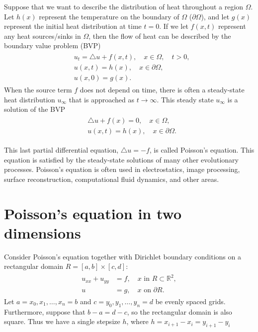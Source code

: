 \label{lab:poisson2d}

Suppose that we want to describe the distribution of heat throughout a region $\Omega$.
Let $h(x)$ represent the temperature on the boundary of $\Omega$ ($\partial \Omega$), and let $g(x)$ represent the initial heat distribution at time $t = 0$.
If we let $f(x,t)$ represent any heat sources/sinks in $\Omega$, then the flow of heat can be described by the boundary value problem (BVP)
\begin{align}
	\begin{split}
		& { } u_t = \triangle u + f(x,t), \quad x \in \Omega, \quad t >0,\\
		& { }u(x,t) = h(x), \quad x \in \partial \Omega, \\
		& { }u(x,0) = g(x).
	\end{split}
\end{align}
When the source term $f$ does not depend on time, there is often a steady-state heat distribution $u_{\infty}$ that is approached as $t \to \infty$.
This steady state $u_{\infty}$ is a solution of the BVP
\begin{align}
	\begin{split}
		& { }  \triangle u + f(x) = 0, \quad x \in \Omega,\\
		& { }u(x,t) = h(x), \quad x \in \partial \Omega.
	\end{split}
\end{align}

This last partial differential equation, $\triangle u = -f$, is called Poisson's equation.
This equation is satisfied by the steady-state solutions of many other evolutionary processes.
Poisson's equation is often used in electrostatics, image processing, surface reconstruction, computational fluid dynamics, and other areas.


\section*{Poisson's equation in two dimensions}

 Consider Poisson's equation together with Dirichlet boundary conditions on a rectangular domain $R = [a,b]\times [c,d]$:
 \begin{align}
	\begin{split}
 	u_{xx} + u_{yy} &= f,\quad x \text{ in } R \subset \mathbb{R}^2,\\
 	u &= g, \quad x \text{ on } \partial R.
	\end{split}\label{eqn:2d_poisson}
\end{align}
Let $a = x_0, x_1, \ldots, x_n = b$ and $c = y_0, y_1, \ldots, y_n = d$ be evenly spaced grids.
Furthermore, suppose that $b-a=d-c$, so the rectangular domain is also square. Thus we have a single stepsize $h$, where $h = x_{i+1}-x_i = y_{i+1}-y_i$

